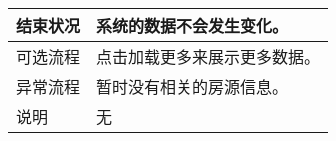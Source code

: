 \begin{table}[htbp]
\begin{tabular}{|l|l|l|l|}
        \hline
        结束状况                          & \multicolumn{3}{l|}{系统的数据不会发生变化。    }                                                                                    \\
        \hline
        可选流程                          & \multicolumn{3}{l|}{点击加载更多来展示更多数据。  }                                                                                  \\
        \hline
        异常流程                          & \multicolumn{3}{l|}{暂时没有相关的房源信息。 }                                                                                       \\
        \hline
        说明                              & \multicolumn{3}{l|}{无     }                                                                                                         \\
        \hline
    \end{tabular}
\end{table}

